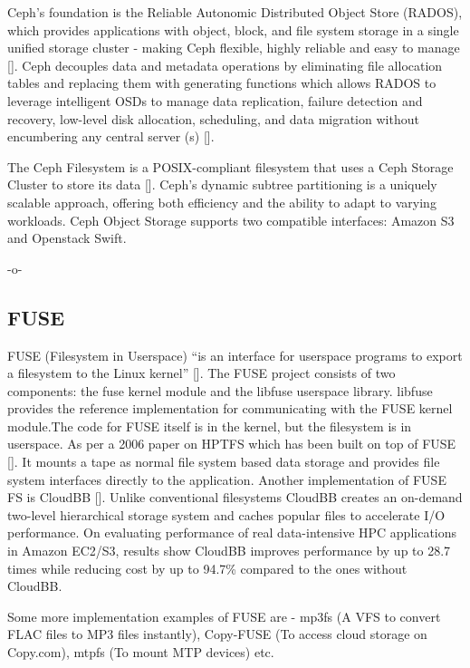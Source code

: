 Ceph's foundation is the Reliable Autonomic Distributed Object Store
(RADOS), which provides applications with object, block, and file
system storage in a single unified storage cluster - making Ceph
flexible, highly reliable and easy to manage [\cite{www-cepharch}]. Ceph
decouples data and metadata operations by eliminating file allocation
tables and replacing them with generating functions which allows RADOS
to leverage intelligent OSDs to manage data replication, failure
detection and recovery, low-level disk allocation, scheduling, and
data migration without encumbering any central server
(s) [\cite{paper-Ceph}].
 
The Ceph Filesystem is a POSIX-compliant filesystem that uses a Ceph
Storage Cluster to store its data [\cite{www-cephfs}]. Ceph's dynamic
subtree partitioning is a uniquely scalable approach, offering both
efficiency and the ability to adapt to varying workloads. Ceph Object
Storage supports two compatible interfaces: Amazon S3 and Openstack
Swift.

     -o-

\subsection{FUSE}

FUSE (Filesystem in Userspace) ``is an interface for userspace
programs to export a filesystem to the Linux
kernel'' [\cite{www-fuse}]. The FUSE project consists of two components:
the fuse kernel module and the libfuse userspace library. libfuse
provides the reference implementation for communicating with the FUSE
kernel module.The code for FUSE itself is in the kernel, but the
filesystem is in userspace.  As per a 2006 paper on HPTFS which has
been built on top of FUSE [\cite{fuse-paper-hptfs}]. It mounts a tape as
normal file system based data storage and provides file system
interfaces directly to the application.  Another implementation of
FUSE FS is CloudBB [\cite{fuse-paper-CloudBB}]. Unlike conventional
filesystems CloudBB creates an on-demand two-level hierarchical
storage system and caches popular files to accelerate I/O
performance. On evaluating performance of real data-intensive HPC
applications in Amazon EC2/S3, results show CloudBB improves
performance by up to 28.7 times while reducing cost by up to 94.7\%
compared to the ones without CloudBB.

Some more implementation examples of FUSE are - mp3fs (A VFS to
convert FLAC files to MP3 files instantly), Copy-FUSE (To access cloud
storage on Copy.com), mtpfs (To mount MTP devices) etc.


